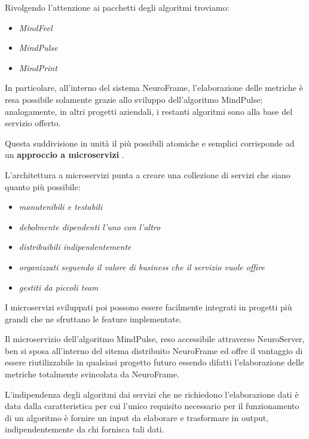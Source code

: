 \noindent Rivolgendo l'attenzione ai pacchetti degli algoritmi troviamo:
\begin{itemize}
    \item \emph{MindFeel}
    \item \emph{MindPulse}
    \item \emph{MindPrint}
\end{itemize}
\noindent In particolare, all'interno del sistema NeuroFrame, l'elaborazione delle metriche è resa possibile solamente grazie allo sviluppo dell'algoritmo MindPulse; analogamente, in altri progetti aziendali, i restanti algoritmi sono alla base del servizio offerto.\newline

\noindent Questa suddivisione in unità il più possibili atomiche e semplici corrisponde ad un {\bf approccio a microservizi} \cite{microservizi}.\newline

\noindent L'architettura a microservizi punta a creare una collezione di servizi che siano quanto più possibile:
\begin{itemize}
    \item \emph{manutenibili e testabili}
    \item \emph{debolmente dipendenti l'uno con l'altro}
    \item \emph{distribuibili indipendentemente}
    \item \emph{organizzati seguendo il valore di business che il servizio vuole offire}
    \item \emph{gestiti da piccoli team}
\end{itemize}

\noindent I microservizi sviluppati poi possono essere facilmente integrati in progetti più grandi che ne sfruttano le feature implementate.\newline

\noindent Il microservizio dell'algoritmo MindPulse, reso accessibile attraverso NeuroServer, ben si sposa all'interno del sitema distribuito NeuroFrame ed offre il vantaggio di essere riutilizzabile in qualsiasi progetto futuro essendo difatti l'elaborazione delle metriche totalmente svincolata da NeuroFrame.\newline

\noindent L'indipendenza degli algoritmi dai servizi che ne richiedono l'elaborazione dati è data dalla caratteristica per cui l'unico requisito necessario per il funzionamento di un algoritmo è fornire un input da elaborare e trasformare in output, indipendentemente da chi fornisca tali dati.
